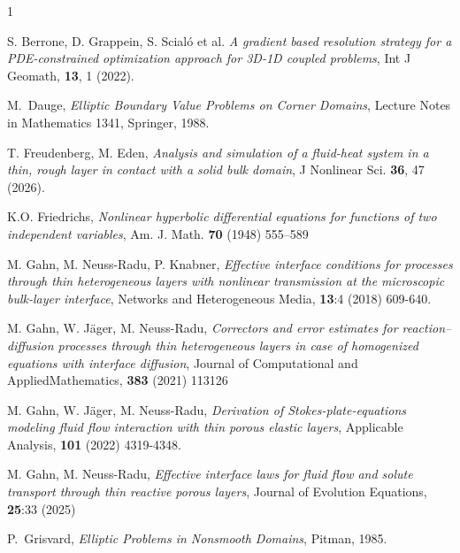 \documentclass[reqno]{amsart}            %
\numberwithin{equation}{section}
\begin{document}
	
	\begin{thebibliography}{1}
		
		S. Berrone, D. Grappein, S. Scial\'o  et al. \textit{A gradient based resolution strategy for a PDE-constrained optimization approach for 3D-1D coupled problems}, Int J Geomath, \textbf{13}, 1 (2022).
		
		M.~Dauge, {\em Elliptic Boundary Value Problems on Corner Domains}, Lecture Notes in Mathematics 1341, Springer, 1988.
		
		
		T. Freudenberg, M. Eden, \textit{Analysis and simulation of a fluid-heat system in a thin, rough layer in contact with a solid bulk domain}, J Nonlinear Sci. \textbf{36}, 47 (2026).
		
		K.O. Friedrichs, \textit{Nonlinear hyperbolic differential equations for functions of two
			independent variables}, Am. J. Math. \textbf{70} (1948) 555–589 
		
		M. Gahn, M. Neuss-Radu, P. Knabner, \textit{Effective interface conditions for processes through thin heterogeneous layers with nonlinear transmission at the microscopic bulk-layer interface}, Networks and Heterogeneous Media, \textbf{13}:4  (2018) 609-640. 
		
		M. Gahn, W. J{\"a}ger, M. Neuss-Radu,
		\textit{Correctors and error estimates for reaction–diffusion
			processes through thin heterogeneous layers in case of
			homogenized equations with interface diffusion}, Journal of Computational and AppliedMathematics, \textbf{383} (2021) 113126
		
		
		M. Gahn, W. J{\"a}ger, M. Neuss-Radu, \textit{Derivation of Stokes-plate-equations modeling fluid flow interaction with thin porous elastic layers}, Applicable Analysis, \textbf{101} (2022) 4319-4348.
		
		M. Gahn, M. Neuss-Radu, \textit{Effective interface laws for fluid flow and solute transport through thin reactive porous layers},
		Journal of Evolution Equations, \textbf{25}:33 (2025)
		
		P.~Grisvard, {\em Elliptic Problems in Nonsmooth Domains}, Pitman, 1985.
		

\end{thebibliography}
\end{document}
